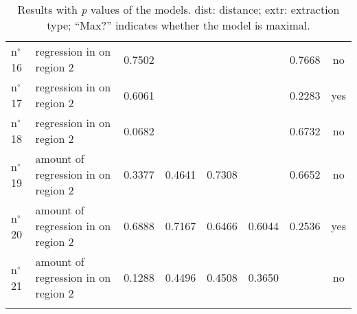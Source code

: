 \begin{sidewaystable}
\begin{tabular}{ll *5{S[table-format=<1.4]} c}
n$^{\circ}$16  & regression in  on region 2                   & 0.7502 &         &         &         & 0.7668 & no   \\
n$^{\circ}$17  & regression in  on region 2                   & 0.6061 &         &         &         & 0.2283 & yes  \\
n$^{\circ}$18  & regression in  on region 2                   & 0.0682 &         &         &         & 0.6732 & no   \\
n$^{\circ}$19  & amount of regression in  on region 2         & 0.3377 & 0.4641 & 0.7308  &         & 0.6652 & no   \\
n$^{\circ}$20  & amount of regression in  on region 2         & 0.6888 & 0.7167 & 0.6466  & 0.6044  & 0.2536 & yes  \\
n$^{\circ}$21  & amount of regression in  on region 2         & 0.1288 & 0.4496 & 0.4508  & 0.3650  &        & no   \\
\lspbottomrule
\end{tabular}
\caption{Results with \emph{p} values of the models. dist: distance; extr: extraction type; “Max?” indicates whether the model is maximal.}
\label{tab:exp03-models}
\end{sidewaystable}
